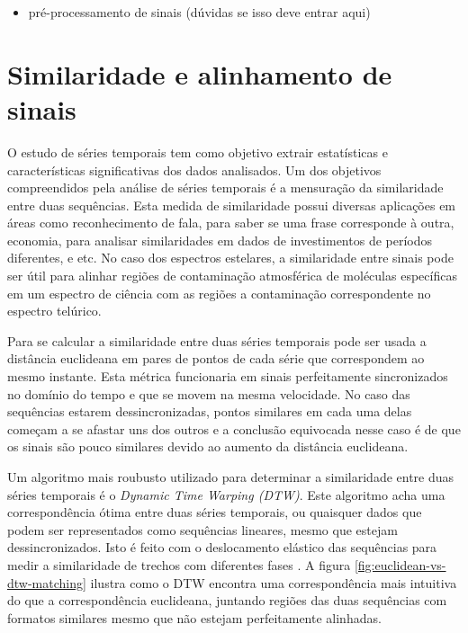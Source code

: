 \begin{itemize}
    \item pré-processamento de sinais (dúvidas se isso deve entrar aqui) 
\end{itemize}


\section{Similaridade e alinhamento de sinais}

O estudo de séries temporais tem como objetivo extrair estatísticas e características significativas dos dados analisados. Um dos objetivos compreendidos pela análise de séries temporais é a mensuração da similaridade entre duas sequências. Esta medida de similaridade possui diversas aplicações em áreas como reconhecimento de fala, para saber se uma frase corresponde à outra, economia, para analisar similaridades em dados de investimentos de períodos diferentes, e etc. No caso dos espectros estelares, a similaridade entre sinais pode ser útil para alinhar regiões de contaminação atmosférica de moléculas específicas em um espectro de ciência com as regiões a contaminação correspondente no espectro telúrico.

Para se calcular a similaridade entre duas séries temporais pode ser usada a distância euclideana em pares de pontos de cada série que correspondem ao mesmo instante. Esta métrica funcionaria em sinais perfeitamente sincronizados no domínio do tempo e que se movem na mesma velocidade. No caso das sequências estarem dessincronizadas, pontos similares em cada uma delas começam a se afastar uns dos outros e a conclusão equivocada nesse caso é de que os sinais são pouco similares devido ao aumento da distância euclideana.

Um algoritmo mais roubusto utilizado para determinar a similaridade entre duas séries temporais é o \textit{Dynamic Time Warping (DTW)}. Este algoritmo acha uma correspondência ótima entre duas séries temporais, ou quaisquer dados que podem ser representados como sequências lineares, mesmo que estejam dessincronizados. Isto é feito com o deslocamento elástico das sequências para medir a similaridade de trechos com diferentes fases \citep{shou2005fast}. A figura \ref{fig:euclidean-vs-dtw-matching} ilustra como o DTW encontra uma correspondência mais intuitiva do que a correspondência euclideana, juntando regiões das duas sequências com formatos similares mesmo que não estejam perfeitamente alinhadas.

